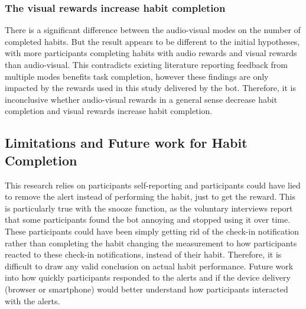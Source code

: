 \documentclass{scaffold/sigchi}
\begin{document}
\subsubsection{The visual rewards increase habit completion}
There is a significant difference between the audio-visual modes on the number of completed habits. But the result appears to be different to the initial hypotheses, with more participants completing habits with audio rewards and visual rewards than audio-visual. This contradicts existing literature reporting feedback from multiple modes benefits task completion, however these findings are only impacted by the rewards used in this study delivered by the bot. Therefore, it is inconclusive whether audio-visual rewards in a general sense decrease habit completion and visual rewards increase habit completion.

\subsection{Limitations and Future work for Habit Completion}
This research relies on participants self-reporting and participants could have lied to remove the alert instead of performing the habit, just to get the reward. This is particularly true with the snooze function, as the voluntary interviews report that some participants found the bot annoying and stopped using it over time. These participants could have been simply getting rid of the check-in notification rather than completing the habit changing the measurement to how participants reacted to these check-in notifications, instead of their habit. Therefore, it is difficult to draw any valid conclusion on actual habit performance. Future work into how quickly participants responded to the alerts and if the device delivery (browser or smartphone) would better understand how participants interacted with the alerts.
\end{document}
